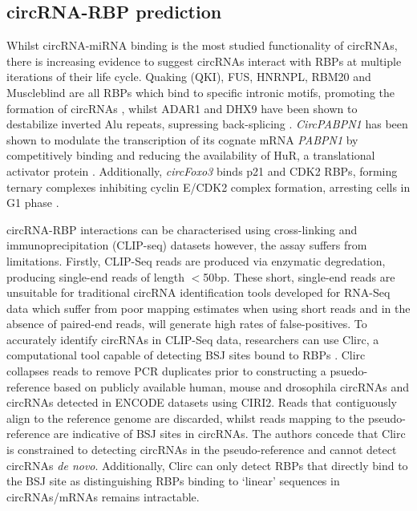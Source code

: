 \documentclass[journal,review,submit,pdftex,moreauthors]{Definitions/mdpi}
\begin{document}
\subsection*{circRNA-RBP prediction}
Whilst circRNA-miRNA binding is the most studied functionality of circRNAs, there is increasing evidence to suggest circRNAs interact with RBPs at multiple iterations of their life cycle. Quaking (QKI), FUS, HNRNPL, RBM20 and Muscleblind are all RBPs which bind to specific intronic motifs, promoting the formation of circRNAs \cite{Ashwal-Fluss2014Oct, Conn2015Mar, Errichelli2017Mar, Fei2017Jun, Khan2016Oct}, whilst ADAR1 and DHX9 have been shown to destabilize inverted Alu repeats, supressing back-splicing \cite{Ivanov2015Jan, Aktas2017Apr}. \textit{CircPABPN1} has been shown to modulate the transcription of its cognate mRNA \textit{PABPN1} by competitively binding and reducing the availability of HuR, a translational activator protein \cite{Abdelmohsen2017Feb}. Additionally, \textit{circFoxo3} binds p21 and CDK2 RBPs, forming ternary complexes inhibiting cyclin E/CDK2 complex formation, arresting cells in G1 phase \cite{Du2016Apr}. \par
circRNA-RBP interactions can be characterised using cross-linking and immunoprecipitation (CLIP-seq) datasets however, the assay suffers from limitations. Firstly, CLIP-Seq reads are produced via enzymatic degredation, producing single-end reads of length $<$50bp. These short, single-end reads are unsuitable for traditional circRNA identification tools developed for RNA-Seq data which suffer from poor mapping estimates when using short reads and in the absence of paired-end reads, will generate high rates of false-positives. To accurately identify circRNAs in CLIP-Seq data, researchers can use Clirc, a computational tool capable of detecting BSJ sites bound to RBPs \cite{Clirc}. Clirc collapses reads to remove PCR duplicates prior to constructing a psuedo-reference based on publicly available human, mouse and drosophila circRNAs and circRNAs detected in ENCODE datasets using CIRI2. Reads that contiguously align to the reference genome are discarded, whilst reads mapping to the pseudo-reference are indicative of BSJ sites in circRNAs. The authors concede that Clirc is constrained to detecting circRNAs in the pseudo-reference and cannot detect circRNAs \textit{de novo}. Additionally, Clirc can only detect RBPs that directly bind to the BSJ site as distinguishing RBPs binding to `linear' sequences in circRNAs/mRNAs remains intractable. \par
\end{document}
